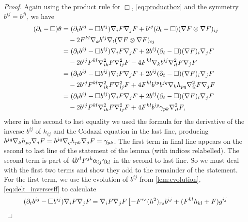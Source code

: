 \documentclass{amsart}
\begin{document}
\begin{proof}
Again using the product rule for \(\Box\), \cref{eq:productbox} and the symmetry \(b^{ij} = b^{ji}\), we have
\begin{equation}
\label{eq:delt_theta}
\begin{split}
(\partial_{t} - \Box)\theta &= (\partial_{t}b^{ij} - \Box b^{ij})\nabla_i F\nabla_jF + b^{ij} (\partial_{t} - \Box) (\nabla F \otimes \nabla F)_{ij} \\
&\quad - 2 F^{kl} \nabla_k b^{ij} \nabla_l (\nabla F \otimes \nabla F)_{ij} \\
&= (\partial_{t}b^{ij} - \Box b^{ij})\nabla_i F\nabla_jF + 2 b^{ij} (\partial_{t} - \Box) (\nabla F)_i \nabla_jF\\ 
&\quad - 2 b^{ij} F^{kl} \nabla^2_{ik} F \nabla^2_{lj} F - 4 F^{kl} \nabla_k b^{ij} \nabla^2_{il} F \nabla_jF \\
&= (\partial_{t}b^{ij} - \Box b^{ij})\nabla_i F\nabla_jF + 2 b^{ij} (\partial_{t} - \Box) (\nabla F)_i \nabla_jF \\
&\quad - 2 b^{ij} F^{kl} \nabla^2_{ik} F \nabla^2_{lj} F + 4 F^{kl} b^{ip}b^{jq} \nabla_k h_{pq} \nabla^2_{il} F \nabla_jF \\
&= (\partial_{t}b^{ij} - \Box b^{ij})\nabla_i F\nabla_jF + 2 b^{ij} (\partial_{t} - \Box) (\nabla F)_i \nabla_jF \\
&\quad - 2 b^{ij} F^{kl} \nabla^2_{ik} F \nabla^2_{lj} F + 4 F^{kl} b^{ip}\gamma_{pk} \nabla^2_{il} F,
\end{split}
\end{equation}
where in the second to last equality we used the formula for the derivative of the inverse \(b^{ij}\) of \(h_{ij}\) and the Codazzi equation in the last line, producing \(b^{jq} \nabla_k h_{pq} \nabla_j F = b^{jq} \nabla_q h_{pk} \nabla_j F = \gamma_{pk}\). The first term in final line appears on the second to last line of the statement of the lemma (with indices relabelled). The second term is part of \(4 b^{il}F^{jk} \alpha_{ij} \gamma_{kl}\) in the second to last line. So we must deal with the first two terms and show they add to the remainder of the statement. For the first term, we use the evolution of \(b^{ij}\) from \cref{lem:evolution}, \cref{eq:delt_inversesff} to calculate
\begin{equation}
\label{eq:delt_theta1}
\begin{split}
(\partial_{t}b^{ij} - \Box b^{ij})\nabla_i \p\nabla_j\p &= \nabla_i \p \nabla_j \p\left[-\p^{rs} (h^2)_{rs} b^{ij} + (\p^{kl}h_{kl} + \p) g^{ij} \right. \\

\end{split}
\end{equation}
\end{proof}
\end{document}
